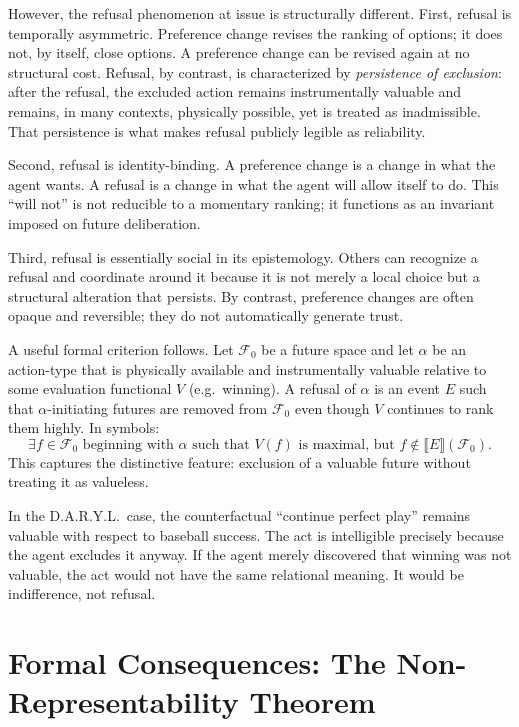 \documentclass[11pt]{article}
\newcommand{\Future}{\mathcal{F}}
\begin{document}
However, the refusal phenomenon at issue is structurally different. First,
refusal is temporally asymmetric. Preference change revises the ranking of
options; it does not, by itself, close options. A preference change can be
revised again at no structural cost. Refusal, by contrast, is characterized by
\emph{persistence of exclusion}: after the refusal, the excluded action remains
instrumentally valuable and remains, in many contexts, physically possible, yet
is treated as inadmissible. That persistence is what makes refusal publicly
legible as reliability.

Second, refusal is identity-binding. A preference change is a change in what
the agent wants. A refusal is a change in what the agent will allow itself to
do. This ``will not'' is not reducible to a momentary ranking; it functions as
an invariant imposed on future deliberation.

Third, refusal is essentially social in its epistemology. Others can recognize
a refusal and coordinate around it because it is not merely a local choice but
a structural alteration that persists. By contrast, preference changes are often
opaque and reversible; they do not automatically generate trust.

A useful formal criterion follows. Let $\Future_0$ be a future space and let
$\alpha$ be an action-type that is physically available and instrumentally
valuable relative to some evaluation functional $V$ (e.g.\ winning). A refusal
of $\alpha$ is an event $E$ such that $\alpha$-initiating futures are removed
from $\Future_0$ even though $V$ continues to rank them highly. In symbols:
\[
\exists f \in \Future_0 \text{ beginning with }\alpha \text{ such that } V(f)
\text{ is maximal, but } f \notin \llbracket E \rrbracket(\Future_0).
\]
This captures the distinctive feature: exclusion of a valuable future without
treating it as valueless.

In the D.A.R.Y.L.\ case, the counterfactual ``continue perfect play'' remains
valuable with respect to baseball success. The act is intelligible precisely
because the agent excludes it anyway. If the agent merely discovered that
winning was not valuable, the act would not have the same relational meaning.
It would be indifference, not refusal.

\section{Formal Consequences: The Non-Representability Theorem}
\label{sec:formal}
\end{document}
